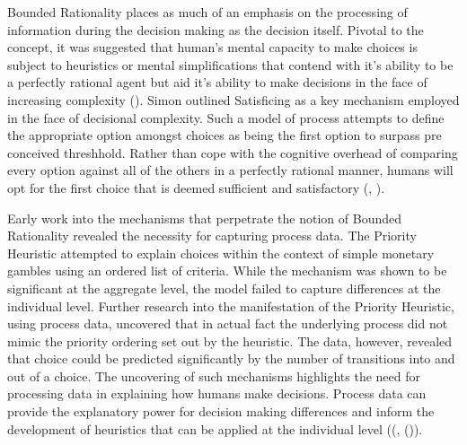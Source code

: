 \documentclass[man, floatsintext]{apa7}
\begin{document}
Bounded Rationality places as much of an emphasis on the processing of information during the decision making as the decision itself. Pivotal to the concept, it was suggested that human's mental capacity to make choices is subject to heuristics or mental simplifications that contend with it's ability to be a perfectly rational agent but aid it's ability to make decisions in the face of increasing complexity (\cite{payneTaskComplexityContingent1976}).  Simon outlined Satisficing as a key mechanism employed in the face of decisional complexity. Such a model of process attempts to define the appropriate option amongst choices as being the first option to surpass pre conceived threshhold. Rather than cope with the cognitive overhead of comparing every option against all of the others in a perfectly rational manner, humans will opt for the first choice that is deemed sufficient and satisfactory (\cite{simonRationalChoiceStructure1956d}, \citeyear{simonBehavioralModelRational1955}).

Early work into the mechanisms that perpetrate the notion of Bounded Rationality revealed the necessity for capturing process data. The Priority Heuristic attempted to explain choices within the context of simple monetary gambles using an ordered list of criteria. While the mechanism was shown to be significant at the aggregate level, the model failed to capture differences at the individual level. Further research into the manifestation of the Priority Heuristic, using process data, uncovered that in actual fact the underlying process did not mimic the priority ordering set out by the heuristic. The data, however, revealed that choice could be predicted significantly by the number of transitions into and out of a choice. The uncovering of such mechanisms highlights the need for processing data in explaining how humans make decisions. Process data can provide the explanatory power for decision making differences and inform the development of heuristics that can be applied at the individual level ((\cite{brandstatterPriorityHeuristicMaking2006}, (\cite{willemsenVisitingDecisionFactory2011})).

\end{document}
